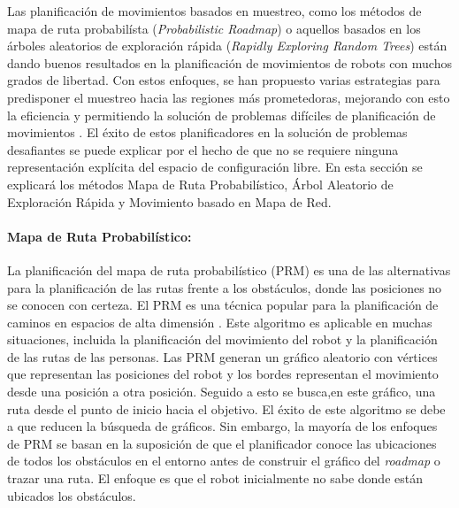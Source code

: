 Las planificación de movimientos basados en muestreo, como los métodos 
de mapa de ruta probabilísta (\textit{Probabilistic Roadmap}) o aquellos 
basados en los árboles aleatorios de exploración rápida 
(\textit{Rapidly Exploring Random Trees}) están dando buenos resultados 
en la planificación de movimientos de robots con muchos grados de 
libertad. Con estos enfoques, se han propuesto varias estrategias para 
predisponer el muestreo hacia las regiones más prometedoras, mejorando 
con esto la eficiencia y permitiendo la solución de problemas difíciles 
de planificación de movimientos \cite{elbanhawi2014sampling}. El éxito 
de estos planificadores en la solución de problemas desafiantes se puede 
explicar por el hecho de que no se requiere ninguna representación 
explícita del espacio de configuración libre. En esta sección se 
explicará los métodos Mapa de Ruta Probabilístico, Árbol Aleatorio de 
Exploración Rápida y Movimiento basado en Mapa de Red.
\paragraph{Mapa de Ruta Probabilístico:} %

La planificaci\'on del mapa de ruta probabil\'istico (PRM) es una de las 
alternativas para la planificaci\'on de las rutas frente a los  
obst\'aculos, donde las posiciones no se conocen con certeza. El PRM es una 
t\'ecnica popular para la planificaci\'on de caminos en espacios de alta 
dimensi\'on \cite{guibas1999probabilistic}. Este algoritmo es aplicable 
en muchas situaciones, incluida la planificaci\'on del movimiento del 
robot y la planificaci\'on de las rutas de las personas. Las PRM generan 
un gr\'afico aleatorio con v\'ertices que representan las posiciones del 
robot y los bordes representan el movimiento desde una posici\'on a otra 
posici\'on. Seguido a esto se busca,en este gr\'afico, una ruta desde el 
punto de inicio hacia el objetivo. El \'exito de este algoritmo se debe 
a que reducen la b\'usqueda de gr\'aficos. Sin embargo, la mayor\'ia de 
los enfoques de PRM se basan en la suposici\'on de que el planificador 
conoce las ubicaciones de todos los obst\'aculos en el entorno antes de 
construir el gr\'afico del \textit{roadmap} o trazar una ruta. El enfoque 
es que el robot inicialmente no sabe donde est\'an ubicados los obst\'aculos.

